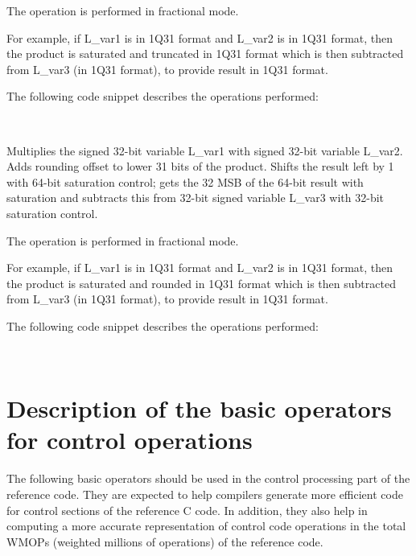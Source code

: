 The operation is performed in fractional mode.

For example, if L\_var1 is in 1Q31 format and L\_var2 is in 1Q31 format, then the product is saturated and truncated in 1Q31 format which is then subtracted from L\_var3 (in 1Q31 format), to provide result in 1Q31 format.

The following code snippet describes the operations performed:

\\


Multiplies the signed 32-bit variable L\_var1 with signed 32-bit variable L\_var2.
Adds rounding offset to lower 31 bits of the product. Shifts the result left by 1 with 64-bit saturation control;
gets the 32 MSB of the 64-bit result with saturation and subtracts this from 32-bit signed variable L\_var3 with 32-bit saturation control.

The operation is performed in fractional mode.

For example, if L\_var1 is in 1Q31 format and L\_var2 is in 1Q31 format, then the product is saturated and rounded in 1Q31 format which is then subtracted from L\_var3 (in 1Q31 format), to provide result in 1Q31 format.

The following code snippet describes the operations performed:

\\



\section{Description of the basic operators for control operations}

The following basic operators should be used in the control processing part of the reference code.
They are expected to help compilers generate more efficient code for control sections of the reference C code.
In addition, they also help in computing a more accurate representation of control code operations in the total WMOPs (weighted millions of operations) of the reference code.


